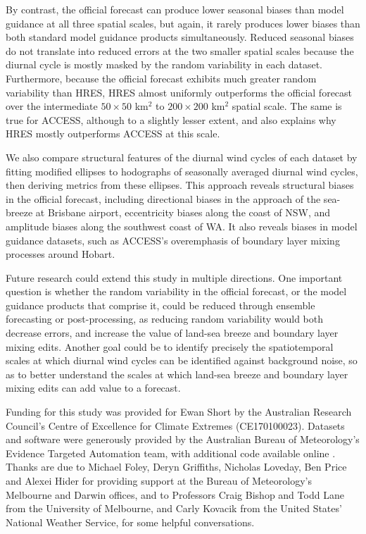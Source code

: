 \documentclass[twocol]{ametsoc}
\begin{document}
By contrast, the official forecast can produce lower seasonal biases than model guidance at all three spatial scales, but again, it rarely produces lower biases than both standard model guidance products simultaneously. Reduced seasonal biases do not translate into reduced errors at the two smaller spatial scales because the diurnal cycle is mostly masked by the random variability in each dataset. Furthermore, because the official forecast exhibits much greater random variability than HRES, HRES almost uniformly outperforms the official forecast over the intermediate $50\times 50$ km$^{2}$ to $200 \times 200$ km$^{2}$ spatial scale. The same is true for ACCESS, although to a slightly lesser extent, and also explains why HRES mostly outperforms ACCESS at this scale. 

We also compare structural features of the diurnal wind cycles of each dataset by fitting modified ellipses to hodographs of seasonally averaged diurnal wind cycles, then deriving metrics from these ellipses. This approach reveals structural biases in the official forecast, including directional biases in the approach of the sea-breeze at Brisbane airport, eccentricity biases along the coast of NSW, and amplitude biases along the southwest coast of WA. It also reveals biases in model guidance datasets, such as ACCESS's overemphasis of boundary layer mixing processes around Hobart.   

Future research could extend this study in multiple directions. One important question is whether the random variability in the official forecast, or the model guidance products that comprise it, could be reduced through ensemble forecasting or post-processing, as reducing random variability would both decrease errors, and increase the value of land-sea breeze and boundary layer mixing edits. Another goal could be to identify precisely the spatiotemporal scales at which diurnal wind cycles can be identified against background noise, so as to better understand the scales at which land-sea breeze and boundary layer mixing edits can add value to a forecast.  

\acknowledgments
Funding for this study was provided for Ewan Short by the Australian Research Council's Centre of Excellence for Climate Extremes (CE170100023). Datasets and software were generously provided by the Australian Bureau of Meteorology's Evidence Targeted Automation team, with additional code available online \citep{shortGitVeri19}. Thanks are due to Michael Foley, Deryn Griffiths, Nicholas Loveday, Ben Price and Alexei Hider for providing support at the Bureau of Meteorology's Melbourne and Darwin offices, and to Professors Craig Bishop and Todd Lane from the University of Melbourne, and Carly Kovacik from the United States' National Weather Service, for some helpful conversations. 


\end{document}
